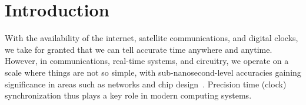 
\section{Introduction}


With the availability of the internet, satellite communications, and digital clocks, we take for granted that we can tell accurate time anywhere and anytime.
%
However, in communications, real-time systems, and circuitry, we operate on a scale where things are not so simple,
with sub-nanosecond-level accuracies gaining significance in areas such as networks and chip design~\cite{nanopu,sub-nanosecond-comms-design}.
Precision time (clock) synchronization thus plays a key role in modern computing systems.

